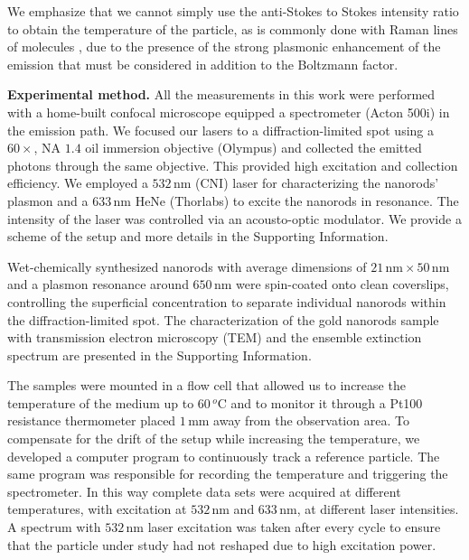 \documentclass[journal=nalefd,manuscript=letter]{achemso}
\newcommand{\HI}[1]{{#1}} %
\newcommand{\nm}{\ensuremath{\,\textrm{nm}}}
\newcommand{\mm}{\ensuremath{\,\textrm{mm}}}
\newcommand{\degree}{\ensuremath{\,^o\textrm{C}}}
\begin{document}
\HI{We emphasize that we cannot simply use the anti-Stokes to Stokes intensity ratio to 
obtain the temperature of the particle, as is commonly done with Raman lines of molecules 
\cite{krishnan1928influence,zondervan2006single}, due to the presence of the strong plasmonic enhancement
of the emission that must be considered in addition to the Boltzmann factor.}

\HI{\textbf{Experimental method.}} All the measurements in this work were performed with a home-built confocal
microscope equipped a spectrometer (Acton 500i) in the emission path.  We focused
our lasers to a diffraction-limited spot using a $60\times$, NA $1.4$ oil immersion
objective (Olympus) and collected the emitted photons through the same
objective. This provided high excitation and collection efficiency.
We employed a $532\nm$ (CNI) laser for characterizing the nanorods' plasmon and
a $633\nm$ HeNe (Thorlabs) to excite the nanorods in resonance.
The intensity of the laser was controlled via an acousto-optic modulator. 
\HI{We provide a scheme of the setup and more details in the Supporting Information.}

Wet-chemically synthesized nanorods\cite{Nikoobakht2003} with average dimensions
of $21\nm\times50\nm$ and a plasmon resonance around $650\nm$ were spin-coated
onto clean coverslips, controlling the superficial concentration to separate
individual nanorods within the diffraction-limited spot\cite{Zijlstra2011}.
\HI{The characterization of the gold nanorods sample with transmission electron microscopy (TEM)
and the ensemble extinction spectrum are presented in the Supporting Information.}

The samples were mounted in a flow cell that allowed us to increase
the temperature of the medium up to $60\degree$ and to monitor it through a
Pt100 resistance thermometer placed $1\mm$ away from the observation area. 
To compensate for the drift of the setup while increasing the temperature, we
developed a computer program to continuously track a reference particle. The
same program was responsible for recording the temperature and triggering the
spectrometer. In this way complete data sets were acquired at different
temperatures, with excitation at $532\nm$ and $633\nm$, at
different laser intensities. A spectrum with $532\nm$ laser excitation 
was taken after every cycle to ensure that the particle under study had 
not reshaped due to high excitation power.
\end{document}

